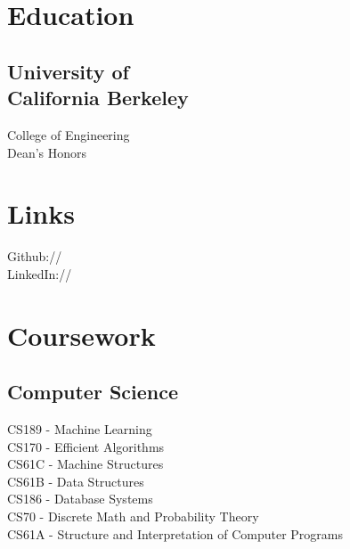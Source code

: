 \documentclass[]{format}
\begin{document}
%
%



%
%

\begin{minipage}[t]{0.33\textwidth} 


\section{Education} 
\subsection[University of California Berkeley]{\texorpdfstring{University of \\ California Berkeley}{University of California Berkeley}}
College of Engineering \\
Dean's Honors\\
\sectionsep


\section{Links} 
Github:// \href{https://github.com/SirjanK}{} \\
LinkedIn://  \href{https://www.linkedin.com/in/sirjankafle}{} \\
\sectionsep


\section{Coursework}
\subsection{Computer Science}
CS189 - Machine Learning \\
CS170 - Efficient Algorithms \\
CS61C - Machine Structures \\
CS61B - Data Structures \\
CS186 - Database Systems \\
CS70 - Discrete Math and Probability Theory \\
CS61A - Structure and Interpretation of Computer Programs
\sectionsep


\end{minipage}
\end{document}
